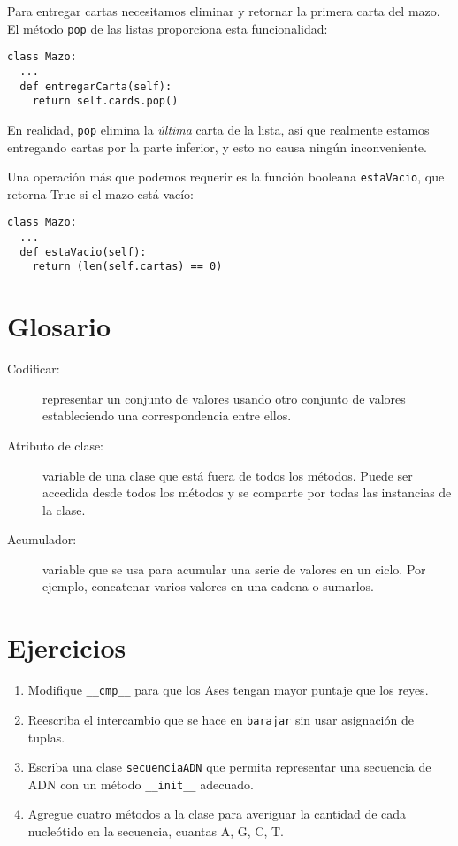 Para entregar cartas necesitamos eliminar y retornar la primera carta
del mazo. El método \texttt{pop} de las listas proporciona esta funcionalidad:
\begin{lstlisting}
class Mazo:
  ...
  def entregarCarta(self):
    return self.cards.pop()
\end{lstlisting}
 En realidad, \texttt{pop} elimina la {\em última} carta de la
lista, así que realmente estamos entregando cartas por la parte inferior,
y esto no causa ningún inconveniente.

 

Una operación más que podemos requerir es la función booleana \texttt{estaVacio},
que retorna True si el mazo está vacío:

\begin{lstlisting}
class Mazo:
  ...
  def estaVacio(self):
    return (len(self.cartas) == 0)
\end{lstlisting}

\section{Glosario}
\begin{description}
\item [{Codificar:}] representar un conjunto de valores usando otro conjunto
de valores estableciendo una correspondencia entre ellos.
\item [{Atributo de clase:}] variable de una clase que está fuera de todos
los métodos. Puede ser accedida desde todos los métodos y se comparte
por todas las instancias de la clase.
\item [{Acumulador:}] variable que se usa para acumular una serie de valores
en un ciclo. Por ejemplo, concatenar varios valores en una cadena
o sumarlos.

  
\end{description}

\section{Ejercicios}
\begin{enumerate}
\item Modifique \texttt{\_\_cmp\_\_} para que los Ases tengan mayor puntaje
que los reyes.
\item Reescriba el intercambio que se hace en \texttt{barajar} sin usar
asignación de tuplas.
\item Escriba una clase \texttt{secuenciaADN} que permita representar una
secuencia de ADN con un método \texttt{\_\_init\_\_} adecuado.
\item Agregue cuatro métodos a la clase para averiguar la cantidad de cada
nucleótido en la secuencia, cuantas A, G, C, T.
\end{enumerate}

